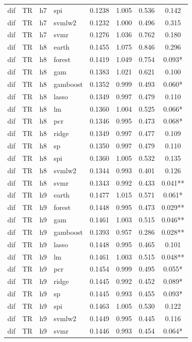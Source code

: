 \begin{ThreePartTable}
\begin{longtable}[t]{llclcccc}
dif & TR & h7 & spi & 0.1238 & 1.005 & 0.536 & 0.142\\
dif & TR & h7 & svmlw2 & 0.1232 & 1.000 & 0.496 & 0.315\\
dif & TR & h7 & svmr & 0.1276 & 1.036 & 0.762 & 0.180\\
\addlinespace
dif & TR & h8 & earth & 0.1455 & 1.075 & 0.846 & 0.296\\
dif & TR & h8 & forest & 0.1419 & 1.049 & 0.754 & 0.093*\\
dif & TR & h8 & gam & 0.1383 & 1.021 & 0.621 & 0.100\\
dif & TR & h8 & gamboost & 0.1352 & 0.999 & 0.493 & 0.060*\\
dif & TR & h8 & lasso & 0.1349 & 0.997 & 0.479 & 0.110\\
dif & TR & h8 & lm & 0.1360 & 1.004 & 0.525 & 0.066*\\
dif & TR & h8 & pcr & 0.1346 & 0.995 & 0.473 & 0.068*\\
dif & TR & h8 & ridge & 0.1349 & 0.997 & 0.477 & 0.109\\
dif & TR & h8 & sp & 0.1350 & 0.997 & 0.479 & 0.110\\
dif & TR & h8 & spi & 0.1360 & 1.005 & 0.532 & 0.135\\
dif & TR & h8 & svmlw2 & 0.1344 & 0.993 & 0.401 & 0.126\\
dif & TR & h8 & svmr & 0.1343 & 0.992 & 0.433 & 0.041**\\
\addlinespace
dif & TR & h9 & earth & 0.1477 & 1.015 & 0.571 & 0.061*\\
dif & TR & h9 & forest & 0.1448 & 0.995 & 0.473 & 0.029**\\
dif & TR & h9 & gam & 0.1461 & 1.003 & 0.515 & 0.046**\\
dif & TR & h9 & gamboost & 0.1393 & 0.957 & 0.286 & 0.028**\\
dif & TR & h9 & lasso & 0.1448 & 0.995 & 0.465 & 0.101\\
dif & TR & h9 & lm & 0.1461 & 1.003 & 0.515 & 0.048**\\
dif & TR & h9 & pcr & 0.1454 & 0.999 & 0.495 & 0.055*\\
dif & TR & h9 & ridge & 0.1445 & 0.992 & 0.452 & 0.089*\\
dif & TR & h9 & sp & 0.1445 & 0.993 & 0.455 & 0.093*\\
dif & TR & h9 & spi & 0.1463 & 1.005 & 0.530 & 0.122\\
dif & TR & h9 & svmlw2 & 0.1449 & 0.995 & 0.445 & 0.116\\
dif & TR & h9 & svmr & 0.1446 & 0.993 & 0.454 & 0.064*\\

\end{longtable}
\end{ThreePartTable}
